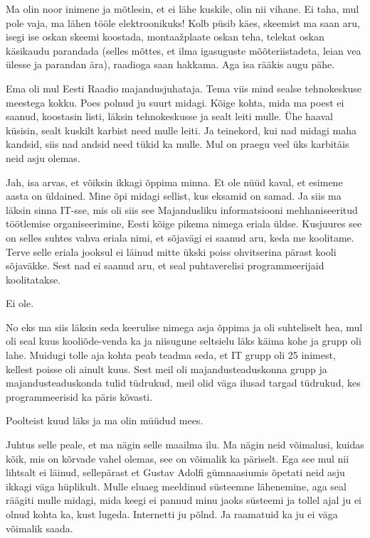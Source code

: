 Ma olin noor inimene ja mõtlesin, et ei lähe kuskile, olin nii vihane. Ei taha, mul pole vaja, ma lähen tööle elektroonikuks! Kolb püsib käes, skeemist ma saan aru, isegi ise oskan skeemi koostada, montaažplaate oskan teha, telekat oskan käsikaudu parandada (selles mõttes, et ilma igasuguste mõõteriistadeta, leian vea ülesse ja parandan ära), raadioga saan hakkama. Aga isa rääkis augu pähe. 


Ema oli mul Eesti Raadio majandusjuhataja. Tema viis mind sealse tehnokeskuse meestega kokku. Poes polnud ju suurt midagi. Kõige kohta, mida ma poest ei saanud, koostasin listi, läksin tehnokeskusse ja sealt leiti mulle. Ühe haaval küsisin, sealt kuskilt karbist need mulle leiti. Ja teinekord, kui nad midagi maha kandsid, siis nad andsid need tükid ka mulle. Mul on praegu veel üks karbitäis neid asju olemas.


Jah, isa arvas, et võiksin ikkagi õppima minna. Et ole nüüd kaval, et esimene aasta on üldained. Mine õpi midagi sellist, kus eksamid on samad. Ja siis ma läksin sinna IT-sse, mis oli siis see  Majandusliku informatsiooni mehhaniseeritud töötlemise organiseerimine, Eesti kõige pikema nimega eriala üldse. Kusjuures see on selles suhtes vahva eriala nimi, et sõjavägi ei saanud aru, keda me koolitame. Terve selle eriala jooksul ei läinud mitte ükski poiss ohvitserina pärast kooli sõjaväkke. Sest nad ei saanud aru, et seal puhtaverelisi programmeerijaid koolitatakse.


Ei ole. 

No eks  ma siis läksin seda keerulise nimega asja õppima ja oli suhteliselt hea, mul oli seal kuus kooliõde-venda ka  ja niisugune seltsielu läks käima kohe ja grupp oli lahe. Muidugi tolle aja kohta peab teadma seda, et IT grupp oli 25 inimest, kellest poisse oli ainult kuus. Sest meil oli majandusteaduskonna grupp ja majandusteaduskonda tulid tüdrukud, meil olid väga ilusad targad tüdrukud, kes programmeerisid ka päris kõvasti. 

Poolteist kuud läks ja ma olin müüdud mees.


Juhtus selle peale, et ma nägin selle maailma ilu. Ma nägin neid võimalusi, kuidas kõik, mis on kõrvade vahel olemas, see on võimalik ka päriselt. Ega see mul nii lihtsalt ei läinud, sellepärast et Gustav Adolfi gümnaasiumis õpetati neid asju ikkagi väga hüplikult. Mulle eluaeg meeldinud süsteemne lähenemine, aga seal räägiti mulle midagi, mida keegi ei pannud minu jaoks süsteemi ja tollel ajal ju ei olnud kohta ka, kust lugeda. Internetti ju põlnd. Ja raamatuid ka ju ei väga võimalik saada. 

